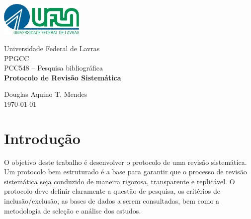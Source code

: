 \documentclass[a4paper,12pt]{article}
\begin{document}
\begin{titlepage}
    \centering
    \includegraphics[width=0.3\textwidth]{./Images/Logo UFLA - Colorida chapada.png}

    \vspace*{2cm} %
    \Large
    Universidade Federal de Lavras\\
    PPGCC\\
    PCC548 – Pesquisa bibliográfica\\
    
    \vspace{2cm} %
    \huge %
    \textbf{Protocolo de Revisão Sistemática}
    
    \vfill %
    
    \large
    Douglas Aquino T. Mendes\\
    \today %
\end{titlepage}

\tableofcontents    %
\newpage

\section{Introdução}

O objetivo deste trabalho é desenvolver o protocolo de uma revisão sistemática. Um protocolo bem estruturado é a base para garantir que o processo de revisão sistemática seja conduzido de maneira rigorosa, transparente e replicável. O protocolo deve definir claramente a questão de pesquisa, os critérios de inclusão/exclusão, as bases de dados a serem consultadas, bem como a metodologia de seleção e análise dos estudos.
\end{document}
